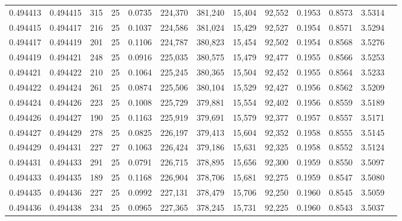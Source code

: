 \begin{tabular}{rrrrrrrrrrrrr}
0.494413 & 0.494415 &   315 &  25 &                                     0.0735 & 224,370 & 381,240 &  15,404 &  92,552 & 0.1953 & 0.8573 & 3.5314 \\
0.494415 & 0.494417 &   216 &  25 &                                     0.1037 & 224,586 & 381,024 &  15,429 &  92,527 & 0.1954 & 0.8571 & 3.5294 \\
0.494417 & 0.494419 &   201 &  25 &                                     0.1106 & 224,787 & 380,823 &  15,454 &  92,502 & 0.1954 & 0.8568 & 3.5276 \\
0.494419 & 0.494421 &   248 &  25 &                                     0.0916 & 225,035 & 380,575 &  15,479 &  92,477 & 0.1955 & 0.8566 & 3.5253 \\
0.494421 & 0.494422 &   210 &  25 &                                     0.1064 & 225,245 & 380,365 &  15,504 &  92,452 & 0.1955 & 0.8564 & 3.5233 \\
0.494422 & 0.494424 &   261 &  25 &                                     0.0874 & 225,506 & 380,104 &  15,529 &  92,427 & 0.1956 & 0.8562 & 3.5209 \\
0.494424 & 0.494426 &   223 &  25 &                                     0.1008 & 225,729 & 379,881 &  15,554 &  92,402 & 0.1956 & 0.8559 & 3.5189 \\
0.494426 & 0.494427 &   190 &  25 &                                     0.1163 & 225,919 & 379,691 &  15,579 &  92,377 & 0.1957 & 0.8557 & 3.5171 \\
0.494427 & 0.494429 &   278 &  25 &                                     0.0825 & 226,197 & 379,413 &  15,604 &  92,352 & 0.1958 & 0.8555 & 3.5145 \\
0.494429 & 0.494431 &   227 &  27 &                                     0.1063 & 226,424 & 379,186 &  15,631 &  92,325 & 0.1958 & 0.8552 & 3.5124 \\
0.494431 & 0.494433 &   291 &  25 &                                     0.0791 & 226,715 & 378,895 &  15,656 &  92,300 & 0.1959 & 0.8550 & 3.5097 \\
0.494433 & 0.494435 &   189 &  25 &                                     0.1168 & 226,904 & 378,706 &  15,681 &  92,275 & 0.1959 & 0.8547 & 3.5080 \\
0.494435 & 0.494436 &   227 &  25 &                                     0.0992 & 227,131 & 378,479 &  15,706 &  92,250 & 0.1960 & 0.8545 & 3.5059 \\
0.494436 & 0.494438 &   234 &  25 &                                     0.0965 & 227,365 & 378,245 &  15,731 &  92,225 & 0.1960 & 0.8543 & 3.5037 \\

\end{tabular}
